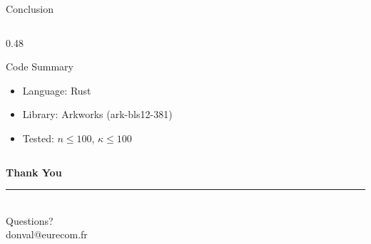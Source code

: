 \documentclass[aspectratio=169,10pt]{beamer}
\begin{document}
\begin{frame}{Conclusion}
\begin{columns}[T]
\begin{column}{0.48\textwidth}
            \vspace{0.4em}

            \begin{exampleblock}{Code Summary}
                \begin{itemize}
                    \item Language: Rust
                    \item Library: Arkworks (ark-bls12-381)
                    \item Tested: $n \leq 100$, $\kappa \leq 100$
                \end{itemize}
            \end{exampleblock}
        \end{column}
    \end{columns}
\end{frame}

\begin{frame}[plain]
    \vspace{2cm}
    \begin{center}
        {\LARGE\bfseries\textcolor{primary}{Thank You}}\\[15pt]
        \textcolor{accent}{\rule{4cm}{1.5pt}}\\[15pt]
        {\large Questions?}\\[30pt]
        {\small donval@eurecom.fr}
    \end{center}
\end{frame}
\end{document}
